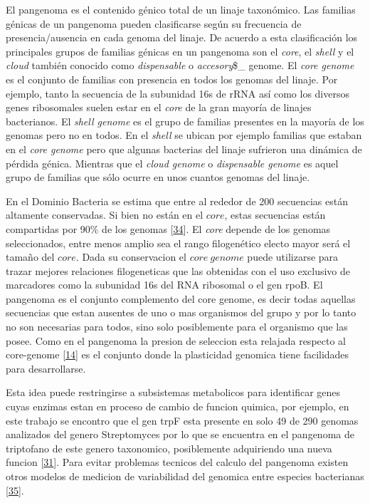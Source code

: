 \documentclass[12pt,twoside]{reedthesis}
\begin{document}
  El pangenoma es el contenido génico total de un linaje taxonómico. Las
  familias génicas de un pangenoma pueden clasificarse según su frecuencia
  de presencia/ausencia en cada genoma del linaje. De acuerdo a esta
  clasificación los principales grupos de familias génicas en un pangenoma
  son el \emph{core}, el \emph{shell} y el \emph{cloud} también conocido
  como \emph{dispensable} o \emph{accesory}\$\_ genome. El \emph{core
  genome} es el conjunto de familias con presencia en todos los genomas
  del linaje. Por ejemplo, tanto la secuencia de la subunidad 16s de rRNA
  así como los diversos genes ribosomales suelen estar en el \emph{core}
  de la gran mayoría de linajes bacterianos. El \emph{shell genome} es el
  grupo de familias presentes en la mayoría de los genomas pero no en
  todos. En el \emph{shell} se ubican por ejemplo familias que estaban en
  el \emph{core genome} pero que algunas bacterias del linaje sufrieron
  una dinámica de pérdida génica. Mientras que el \emph{cloud genome} o
  \emph{dispensable genome} es aquel grupo de familias que sólo ocurre en
  unos cuantos genomas del linaje.
  
  En el Dominio Bacteria se estima que entre al rededor de 200 secuencias
  están altamente conservadas. Si bien no están en el \(core\), estas
  secuencias están compartidas por 90\% de los genomas
  {[}\protect\hyperlink{ref-halachev_calculating_2011}{34}{]}. El
  \emph{core} depende de los genomas seleccionados, entre menos amplio sea
  el rango filogenético electo mayor será el tamaño del \(core\). Dada su
  conservacion el \(core~genome\) puede utilizarse para trazar mejores
  relaciones filogeneticas que las obtenidas con el uso exclusivo de
  marcadores como la subunidad 16s del RNA ribosomal o el gen rpoB. El
  pangenoma es el conjunto complemento del core genome, es decir todas
  aquellas secuencias que estan ausentes de uno o mas organismos del grupo
  y por lo tanto no son necesarias para todos, sino solo posiblemente para
  el organismo que las posee. Como en el pangenoma la presion de seleccion
  esta relajada respecto al core-genome
  {[}\protect\hyperlink{ref-firn_darwinian_2009}{14}{]} es el conjunto
  donde la plasticidad genomica tiene facilidades para desarrollarse.
  
  Esta idea puede restringirse a subsistemas metabolicos para identificar
  genes cuyas enzimas estan en proceso de cambio de funcion quimica, por
  ejemplo, en este trabajo se encontro que el gen trpF esta presente en
  solo 49 de 290 genomas analizados del genero Streptomyces por lo que se
  encuentra en el pangenoma de triptofano de este genero taxonomico,
  posiblemente adquiriendo una nueva funcion
  {[}\protect\hyperlink{ref-ma_unconventional_2013}{31}{]}. Para evitar
  problemas tecnicos del calculo del pangenoma existen otros modelos de
  medicion de variabilidad del genomica entre especies bacterianas
  {[}\protect\hyperlink{ref-kislyuk_genomic_2011}{35}{]}.
  
\end{document}
